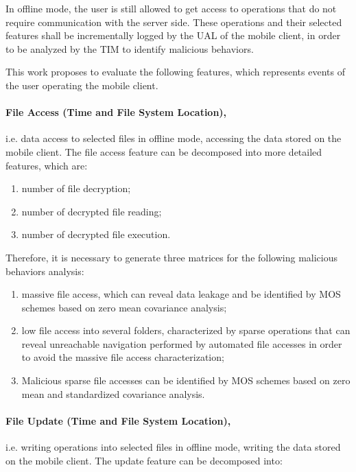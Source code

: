 In offline mode, the user is still allowed to get access to operations that do not require communication with the server side. These operations and their selected features shall be incrementally logged by the UAL of the mobile client, in order to be analyzed by the TIM to identify malicious behaviors. 

This work proposes to evaluate the following features, which represents events of the user operating the mobile client.

\paragraph{\textbf{File Access (Time and File System Location)},}i.e. data access to selected files in offline mode, accessing the data stored on the mobile client. The file access feature can be decomposed into more detailed features, which are:

\begin{enumerate}
	\item number of file decryption;
	\item number of decrypted file reading;
	\item number of decrypted file execution. 
\end{enumerate}

Therefore, it is necessary to generate three matrices for the following malicious behaviors analysis: 

\begin{enumerate}[label=(\alph*)]
	\item massive file access, which can reveal data leakage and be identified by MOS schemes based on zero mean covariance analysis; 
	\item low file access into several folders, characterized by sparse operations that can reveal unreachable navigation performed by automated file accesses in order to avoid the massive file access characterization;
	\item Malicious sparse file accesses can be identified by MOS schemes based on zero mean and standardized covariance analysis. 
\end{enumerate}

\paragraph{\textbf{File Update (Time and File System Location)},}i.e. writing operations into selected files in offline mode, writing the data stored on the mobile client. The update feature can be decomposed into:

